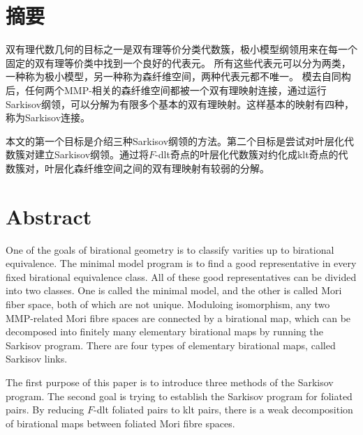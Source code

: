 

\maketitle%
\MAKETITLE%
\makedeclaration%


\intobmk\chapter*{摘\quad 要}%
\setcounter{page}{1}%

双有理代数几何的目标之一是双有理等价分类代数簇，极小模型纲领用来在每一个固定的双有理等价类中找到一个良好的代表元。
所有这些代表元可以分为两类，一种称为极小模型，另一种称为森纤维空间，两种代表元都不唯一。
模去自同构后，任何两个MMP-相关的森纤维空间都被一个双有理映射连接，通过运行Sarkisov纲领，可以分解为有限多个基本的双有理映射。这样基本的映射有四种，称为Sarkisov连接。

本文的第一个目标是介绍三种Sarkisov纲领的方法。第二个目标是尝试对叶层化代数簇对建立Sarkisov纲领。通过将$F$-dlt奇点的叶层化代数簇对约化成klt奇点的代数簇对，叶层化森纤维空间之间的双有理映射有较弱的分解。 


\intobmk\chapter*{Abstract}%

One of the goals of birational geometry is to classify varities up to birational equivalence. The minimal model program  is to find a good representative in every fixed birational equivalence class. 
All of these good representatives can be divided into two classes. One is called the minimal model, and the other is called Mori fiber space, both of  which are not unique. 
Moduloing isomorphism, any two MMP-related Mori fibre spaces are connected by a birational map, which can be decomposed into finitely many  elementary birational maps by running the Sarkisov program. There are four types of elementary birational maps, called Sarkisov links.

The first purpose of this paper is to introduce three methods of the Sarkisov program.
The second goal is trying to establish the Sarkisov program for foliated pairs. By reducing $F$-dlt foliated pairs to klt pairs, there is a weak decomposition of birational maps between foliated Mori fibre spaces.  


\cleardoublepage\pagestyle{frontmatterstyle}%

